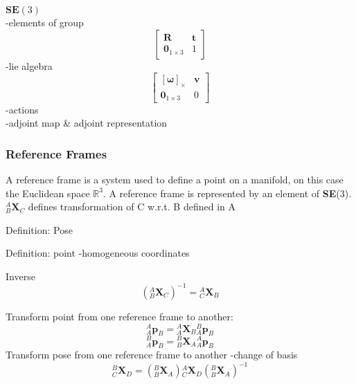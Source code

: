 		\textbf{ $\textbf{SE}(3)$}\\
		-elements of group\\
		\begin{equation}
			\begin{bmatrix}
				\mathbf{R}	&	\mathbf{t} \\
			  	\textbf{0}_{1 \times 3}		& 	1 
			\end{bmatrix}
		\end{equation}
		-lie algebra\\
		\begin{equation}
			\begin{bmatrix}
				  [\mathbf{\omega}]_\times	&  \mathbf{v}\\
				  \textbf{0}_{1 \times 3} & 0						  
			\end{bmatrix}
		\end{equation}
		-actions\\
		-adjoint map \& adjoint representation
		
	\subsubsection{Reference Frames}
		A reference frame is a system used to define a point on a manifold, on this case the Euclidean space $\mathbb{R}^3$. A reference frame is represented by an element of \textbf{SE}(3).\\
		$^{A}_{B}\mathbf{X}^{}_{C}$ defines transformation of C w.r.t. B defined in A
		
		Definition: Pose
			
		Definition: point
		-homogeneous coordinates		
		
		Inverse
		\begin{equation}
			({^{A}_{B}\mathbf{X}^{}_{C}})^{-1} = {^{A}_{C}\mathbf{X}^{}_{B}}
		\end{equation}
		
		Transform point from one reference frame to another:
		\begin{equation}
			{^{A}_{A}\mathbf{p}^{}_{B}} = {^{A}_{A}\mathbf{X}^{}_{B}}{^{B}_{A}\mathbf{p}^{}_{B}}
		\end{equation}
		\begin{equation}
			{^{B}_{A}\mathbf{p}^{}_{B}} = {^{B}_{B}\mathbf{X}^{}_{A}}{^{A}_{A}\mathbf{p}^{}_{B}}
		\end{equation}
		Transform pose from one reference frame to another	
		-change of basis
		\begin{equation}
			{^{B}_{C}\mathbf{X}^{}_{D}} = ({^{B}_{B}\mathbf{X}^{}_{A}}){^{A}_{C}\mathbf{X}^{}_{D}}({^{B}_{B}\mathbf{X}^{}_{A}})^{-1}
		\end{equation}

